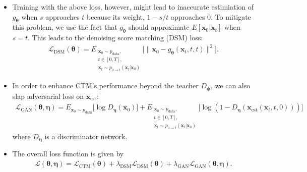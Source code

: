 \documentclass[10pt]{article}
\newcommand{\ve}[1]{\mathbf{#1}}
\newcommand{\ves}[1]{\boldsymbol{#1}}
\newcommand{\mrm}[1]{\mathrm{#1}}
\newcommand{\mcal}[1]{\mathcal{#1}}
\newcommand{\data}{\mathrm{data}}
\begin{document}
\begin{itemize}
  \item Training with the above loss, however, might lead to inaccurate estimiation of $g_{\ves{\theta}}$ when $s$ approaches $t$ because its weight, $1 - s/t$ approaches $0$. To mitigate this problem, we use the fact that $g_{\ves{\theta}}$ should approximate $E[\ve{x}_0|\ve{x}_t]$ when $s = t$. This leads to the denoising score matching (DSM) loss:
  \begin{align*}
    \mcal{L}_{\mrm{DSM}}(\ves{\theta}) = E_{\substack{\ve{x}_0 \sim p_{\data}, \\ t \in [0,T], \\ \ve{x}_t \sim p_{0 \rightarrow t}(\ve{x}_t|\ve{x}_0) }} \big[  \| \ve{x}_0 - g_{\ves{\theta}}(\ve{x}_t, t, t) \|^2  \big].
  \end{align*}

  \item In order to enhance CTM's performance beyond the teacher $D_{\ves{\phi}}$, we can also slap adversarial loss on $\ve{x}_{\mrm{est}}$:
  \begin{align*}
    \mcal{L}_{\mrm{GAN}}(\ves{\theta}, \ves{\eta}) = E_{\ve{x}_0 \sim p_{\data}}\big[\log D_{\ves{\eta}}(\ve{x}_0)\big] +  E_{\substack{\ve{x}_0 \sim p_{\data}, \\ t \in [0,T], \\ \ve{x}_t \sim p_{0 \rightarrow t}(\ve{x}_t|\ve{x}_0) }} \big[  \log(1 - D_{\ves{\eta}}(\ve{x}_{\mrm{est}}(\ve{x}_t, t, 0)))  \big]
  \end{align*}
  where $D_{\ves{\eta}}$ is a discriminator network.

  \item The overall loss function is given by
  \begin{align*}
    \mcal{L}(\ves{\theta},\ves{\eta}) = \mcal{L}_{\mrm{CTM}}(\ves{\theta}) +  \lambda_{\mrm{DSM}} \mcal{L}_{\mrm{DSM}}(\ves{\theta}) + \lambda_{\mrm{GAN}} \mcal{L}_{\mrm{GAN}}(\ves{\theta}, \ves{\eta}).
  \end{align*}


\end{itemize}
\end{document}
